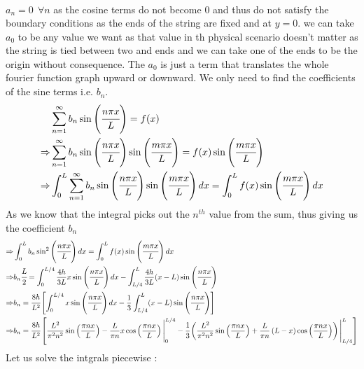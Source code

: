 \documentclass[addpoints]{exam}
\begin{document}
\begin{questions}
\begin{solution}
\begin{align*}
    \end{align*}
    $a_n = 0\ \ \forall n$ as the cosine terms do not become $0$ and thus do not satisfy the boundary conditions as the ends of the string are fixed and at $y=0$.
    we can take $a_0$ to be any value we want as that value in th physical scenario doesn't matter as the string is tied between two and ends and we can take one of the ends to
    be the origin without consequence. The $a_0$ is just a term that translates the whole fourier function graph upward or downward. We only need to find the 
    coefficients of the sine terms i.e. $b_n$. 
    \begin{align*}
        &\sum_{n=1}^\infty b_n \sin\left(\cfrac{n\pi x}{L}\right) = f(x) \\ 
        \Rightarrow&\sum_{n=1}^\infty b_n \sin\left(\cfrac{n\pi x}{L}\right)\sin\left(\cfrac{m\pi x}{L}\right) = f(x)\sin\left(\cfrac{m\pi x}{L}\right)\\
        \Rightarrow&\int^{L}_{0}\sum_{n=1}^\infty b_n \sin\left(\cfrac{n\pi x}{L}\right)\sin\left(\cfrac{m\pi x}{L}\right)dx = \int^{L}_{0}f(x)\sin\left(\cfrac{m\pi x}{L}\right)dx\\
    \end{align*}
    As we know that the integral picks out the $n^{th}$ value from the sum, thus giving us the coefficient $b_n$
    \begin{align*}
        \Rightarrow&\int^{L}_{0} b_n \sin^2\left(\cfrac{n\pi x}{L}\right)dx = \int^{L}_{0}f(x)\sin\left(\cfrac{m\pi x}{L}\right)dx\\
        \Rightarrow& b_n \cfrac{L}{2} = \int^{L/4}_0 \frac{4h}{3L}x\sin\left(\cfrac{n\pi x}{L}\right)dx - \int^L_{L/4}\frac{4h}{3L}(x-L)\sin\left(\cfrac{n\pi x}{L}\right)\\ 
        \Rightarrow& b_n = \cfrac{8h}{L^2}\left[\int^{L/4}_0x\sin\left(\cfrac{n\pi x}{L}\right)dx - \frac{1}{3}\int^L_{L/4}(x-L)\sin\left(\cfrac{n\pi x}{L}\right)\right]\\ 
        \Rightarrow & b_n = \cfrac{8h}{L^2}\left[ \frac{L^2}{{\pi}^2n^2}\sin\left(\frac{{\pi}nx}{L}\right)- \frac{L}{{\pi}n}x\cos\left(\frac{{\pi}nx}{L}\right)\Bigg|_{0}^{L/4} 
        -\cfrac{1}{3}\left(\frac{L^2}{\pi^2n^2}\sin\left(\frac{{\pi}nx}{L}\right)+\frac{L}{\pi n}\left(L-x\right)\cos\left(\frac{\pi nx}{L}\right)\right)\Bigg|_{L/4}^{L}\right]\\ 
    \end{align*}
    Let us solve the intgrals piecewise : 
    \begin{align*}
        \tag{Part 1}

\end{align*}
\end{solution}
\end{questions}
\end{document}
